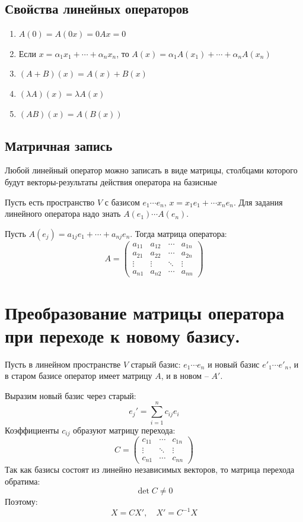 \documentclass[14pt]{extreport}
\begin{document}
    \section{Свойства линейных операторов}
    \begin{enumerate}
        \item $A(0) = A(0x) = 0Ax = 0$
        \item Если $x = \alpha_1 x_1 + \cdots + \alpha_n x_n$, то $A(x) = \alpha_1A(x_1) + \cdots + \alpha_nA(x_n)$
        \item $(A+B)(x) = A(x) + B(x)$
        \item $(\lambda A)(x) = \lambda A(x)$
        \item $(AB)(x) = A(B(x))$
    \end{enumerate}

    \section{Матричная запись}
    Любой линейный оператор можно записать в виде матрицы, столбцами которого будут векторы-результаты действия оператора на базисные

    Пусть есть пространство $V$ с базисом $e_1\cdots e_n$, $x = x_1e_1 + \cdots x_ne_n$. Для задания линейного оператора надо знать $A(e_1)\cdots A(e_n)$.

    Пусть $A(e_j) = a_{1j}e_1 + \cdots + a_{nj}e_n$. Тогда матрица оператора:
    $$
    A = \begin{pmatrix}
        a_{11} & a_{12} & \cdots & a_{1n}\\
        a_{21} & a_{22} & \cdots & a_{2n} \\
        \vdots & \vdots & \ddots & \vdots\\
        a_{n1} & a_{n2} & \cdots & a_{nn}
    \end{pmatrix}
    $$

    \chapter{Преобразование матрицы оператора при переходе к новому базису.}
    Пусть в линейном пространстве $V$ старый базис: $e_1\cdots e_n$ и новый базис $e'_1\cdots e'_n$, и в старом базисе оператор имеет матрицу $A$, и в новом -- $A'$.

    Выразим новый базис через старый:
    $$
    e_j'=\sum_{i=1}^nc_{ij}e_i
    $$
    Коэффициенты $c_{ij}$ образуют матрицу перехода:
    $$
    C = \begin{pmatrix}
        c_{11} & \cdots & c_{1n}\\
        \vdots & \ddots & \vdots\\
        c_{n1} & \cdots & c_{nn}
    \end{pmatrix}
    $$
    Так как базисы состоят из линейно независимых векторов, то матрица перехода обратима:
    $$
    \det C \ne 0
    $$
    Поэтому:
    $$
    X = CX',\quad X' = C^{-1}X
    $$
\end{document}
